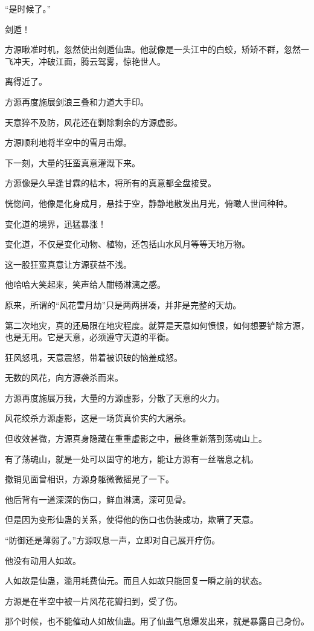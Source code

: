 \begin{this_body}
“是时候了。”

剑遁！

方源瞅准时机，忽然使出剑遁仙蛊。他就像是一头江中的白蛟，矫矫不群，忽然一飞冲天，冲破江面，腾云驾雾，惊艳世人。

离得近了。

方源再度施展剑浪三叠和力道大手印。

天意猝不及防，风花还在剿除剩余的方源虚影。

方源顺利地将半空中的雪月击爆。

下一刻，大量的狂蛮真意灌溉下来。

方源像是久旱逢甘霖的枯木，将所有的真意都全盘接受。

恍惚间，他像是化身成月，悬挂于空，静静地散发出月光，俯瞰人世间种种。

变化道的境界，迅猛暴涨！

变化道，不仅是变化动物、植物，还包括山水风月等等天地万物。

这一股狂蛮真意让方源获益不浅。

他哈哈大笑起来，笑声给人酣畅淋漓之感。

原来，所谓的“风花雪月劫”只是两两拼凑，并非是完整的天劫。

第二次地灾，真的还局限在地灾程度。就算是天意如何愤恨，如何想要铲除方源，也是无用。它是天意，必须遵守天道的平衡。

狂风怒吼，天意震怒，带着被识破的恼羞成怒。

无数的风花，向方源袭杀而来。

方源再度施展万我，大量的方源虚影，分散了天意的火力。

风花绞杀方源虚影，这是一场货真价实的大屠杀。

但收效甚微，方源真身隐藏在重重虚影之中，最终重新落到荡魂山上。

有了荡魂山，就是一处可以固守的地方，能让方源有一丝喘息之机。

撤销见面曾相识，方源身躯微微摇晃了一下。

他后背有一道深深的伤口，鲜血淋漓，深可见骨。

但是因为变形仙蛊的关系，使得他的伤口也伪装成功，欺瞒了天意。

“防御还是薄弱了。”方源叹息一声，立即对自己展开疗伤。

他没有动用人如故。

人如故是仙蛊，滥用耗费仙元。而且人如故只能回复一瞬之前的状态。

方源是在半空中被一片风花花瓣扫到，受了伤。

那个时候，也不能催动人如故仙蛊。用了仙蛊气息爆发出来，就是暴露自己身份。


\end{this_body}
